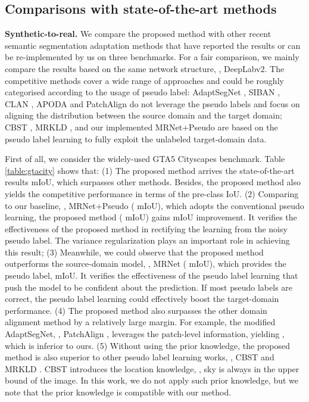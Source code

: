 \subsection{Comparisons with state-of-the-art methods}
\textbf{Synthetic-to-real.} We compare the proposed method with other recent semantic segmentation adaptation methods that have reported the results or can be re-implemented by us on three benchmarks. For a fair comparison, we mainly compare the results based on the same network structure, \ie, DeepLabv2. The competitive methods cover a wide range of approaches and could be roughly categorised according to the usage of pseudo label: AdaptSegNet \cite{tsai2018learning}, SIBAN \cite{luo2019significance}, CLAN \cite{luo2019taking}, APODA \cite{yang2020adversarial} and PatchAlign \cite{tsai2018learning} do not leverage the pseudo labels and focus on aligning the distribution between the source domain and the target domain; CBST \cite{zou2018unsupervised}, MRKLD \cite{zou2019confidence},  and our implemented MRNet+Pseudo are based on the pseudo label learning to fully exploit the unlabeled target-domain data.

 First of all, we consider the widely-used GTA5  Cityscapes benchmark.  Table \ref{table:gtacity} shows that: (1) The proposed method arrives the state-of-the-art results  mIoU, which surpasses other methods. Besides, the proposed method also yields the competitive performance in terms of the pre-class IoU. 
(2) Comparing to our baseline, \ie, MRNet+Pseudo ( mIoU), which adopts the conventional pseudo learning, the proposed method ( mIoU) gains  mIoU improvement. It verifies the effectiveness of the proposed method in rectifying the learning from the noisy pseudo label. The variance regularization plays an important role in achieving this result; 
 (3) Meanwhile, we could observe that the proposed method outperforms the source-domain model, \ie, MRNet ( mIoU), which provides the pseudo label,  mIoU. It verifies the effectiveness of the pseudo label learning that push the model to be confident about the prediction. If most pseudo labels are correct, the pseudo label learning could effectively boost the target-domain performance. 
 (4) The proposed method also surpasses the other domain alignment method by a relatively large margin. For example, the modified AdaptSegNet, \ie, PatchAlign \cite{tsai2018learning}, leverages the patch-level information, yielding , which is inferior to ours.
 (5) Without using the prior knowledge, the proposed method is also superior to other pseudo label learning works, \ie, CBST \cite{zou2018unsupervised} and MRKLD \cite{zou2019confidence}. CBST \cite{zou2018unsupervised} introduces the location knowledge, \eg, sky is always in the upper bound of the image. In this work, we do not apply such prior knowledge, but we note that the prior knowledge is compatible with our method.

